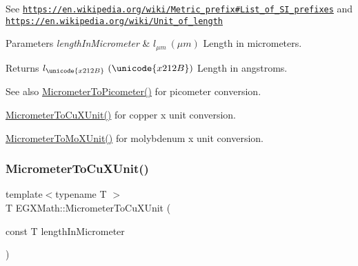 See \href{https://en.wikipedia.org/wiki/Metric_prefix#List_of_SI_prefixes}{\tt https\+://en.\+wikipedia.\+org/wiki/\+Metric\+\_\+prefix\#\+List\+\_\+of\+\_\+\+S\+I\+\_\+prefixes} and \href{https://en.wikipedia.org/wiki/Unit_of_length}{\tt https\+://en.\+wikipedia.\+org/wiki/\+Unit\+\_\+of\+\_\+length} 
\begin{DoxyParams}{Parameters}
{\em length\+In\+Micrometer} & $ l_{\mu m}\ (\mu m)$ Length in micrometers. \\
\hline
\end{DoxyParams}
\begin{DoxyReturn}{Returns}
$ l_{\unicode{x212B}}\ (\unicode{x212B})$ Length in angstroms. 
\end{DoxyReturn}
\begin{DoxySeeAlso}{See also}
\mbox{\hyperlink{group___e_g_x_math-_conversions-_length_conversions-_micrometer-_s_i_ga912ed4989391eeb5d25f43e99108502e}{Micrometer\+To\+Picometer()}} for picometer conversion. 

\mbox{\hyperlink{group___e_g_x_math-_conversions-_length_conversions-_micrometer-_non-_s_i_ga9ec609bbfdde5144c9f40d9093a5b8a7}{Micrometer\+To\+Cu\+X\+Unit()}} for copper x unit conversion. 

\mbox{\hyperlink{group___e_g_x_math-_conversions-_length_conversions-_micrometer-_non-_s_i_ga2ed475ce56e23d7783d6925f5b409f44}{Micrometer\+To\+Mo\+X\+Unit()}} for molybdenum x unit conversion. 
\end{DoxySeeAlso}
\mbox{\label{group___e_g_x_math-_conversions-_length_conversions-_micrometer-_non-_s_i_ga9ec609bbfdde5144c9f40d9093a5b8a7}} 
\subsubsection{\texorpdfstring{Micrometer\+To\+Cu\+X\+Unit()}{MicrometerToCuXUnit()}}
{\footnotesize\ttfamily template$<$typename T $>$ \\
T E\+G\+X\+Math\+::\+Micrometer\+To\+Cu\+X\+Unit (\begin{DoxyParamCaption}\item[{const T}]{length\+In\+Micrometer }\end{DoxyParamCaption})}



